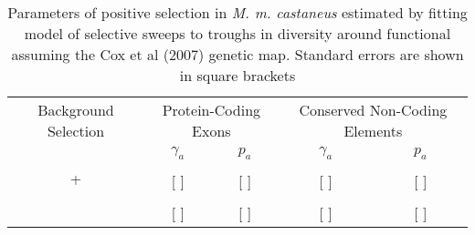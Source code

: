 

\begin{table}[h]
\caption{Parameters of positive selection in \textit{M. m. castaneus} estimated by fitting model of selective sweeps to troughs in diversity around functional assuming the Cox et al (2007) genetic map. Standard errors are shown in square brackets}
\centering
	\label{EstimatesCastaneus}
        \begin{tabular}{ccccc}

        \hline
             Background Selection & \multicolumn{2}{c}{Protein-Coding Exons} & \multicolumn{2}{c}{Conserved Non-Coding Elements}  \\
   &  $\gamma_a$ & $p_a$ &$\gamma_a$ & $p_a$  \\ [0.5ex] \hline

 \multirow{2}{*}{+} & & & &  \\
   &  [  ] & [  ]& [  ] & [  ]\\ \hdashline
   
 \multirow{2}{*}{-}  &   &  &  &  \\
  &   [  ] & [  ]& [  ] & [  ]\\ \hline

        \end{tabular}
    \label{tab:Table2}
    
\end{table}

\linespread{1}
